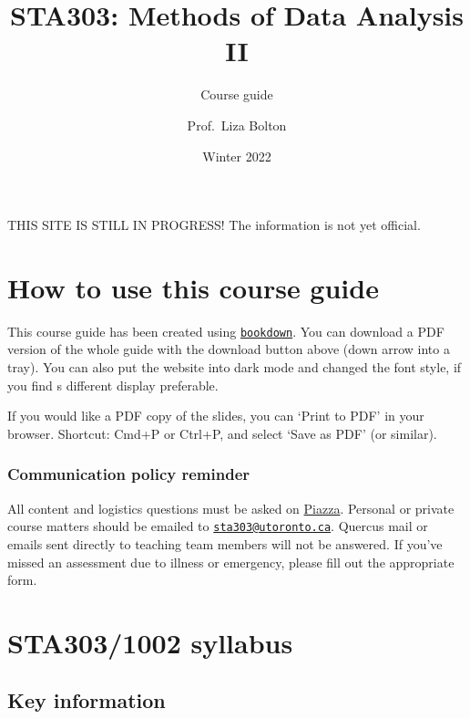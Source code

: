 \documentclass[
]{book}
\title{STA303: Methods of Data Analysis II}
\subtitle{Course guide}
\author{Prof.~Liza Bolton}
\date{Winter 2022}
\begin{document}
\maketitle

{
\hypersetup{linkcolor=}
\setcounter{tocdepth}{1}
\tableofcontents
}
THIS SITE IS STILL IN PROGRESS! The information is not yet official.

\hypertarget{how-to-use-this-course-guide}{%
\chapter{How to use this course guide}\label{how-to-use-this-course-guide}}

This course guide has been created using \href{https://bookdown.org/}{\texttt{bookdown}}. You can download a PDF version of the whole guide with the download button above (down arrow into a tray). You can also put the website into dark mode and changed the font style, if you find s different display preferable.

If you would like a PDF copy of the slides, you can `Print to PDF' in your browser. Shortcut: Cmd+P or Ctrl+P, and select `Save as PDF' (or similar).

\hypertarget{communication-policy-reminder}{%
\subsection{Communication policy reminder}\label{communication-policy-reminder}}

All content and logistics questions must be asked on \href{https://piazza.com/class/kx47tj4fmy65dg}{Piazza}. Personal or private course matters should be emailed to \href{mailto:sta303@utoronto.ca}{\nolinkurl{sta303@utoronto.ca}}. Quercus mail or emails sent directly to teaching team members will not be answered. If you've missed an assessment due to illness or emergency, please fill out the appropriate form.

\hypertarget{syllabus}{%
\chapter{STA303/1002 syllabus}\label{syllabus}}

\hypertarget{key-information}{%
\section{Key information}\label{key-information}}

\raggedright
\end{document}
